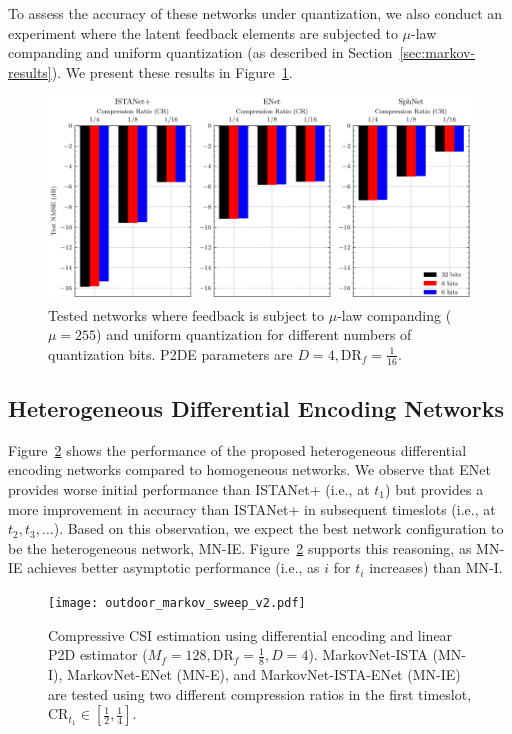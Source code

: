 To assess the accuracy of these networks under quantization, we also conduct an experiment where the latent feedback elements are subjected to $\mu$-law companding and uniform quantization (as described in Section~\ref{sec:markov-results}). We present these results in Figure~\ref{fig:net_quant}.

\begin{figure}[!hbtp]
    \centering
    \includegraphics[width=\linewidth]{./images/outdoor_net_quant.pdf}
    \caption{Tested networks where feedback is subject to $\mu$-law companding ($\mu=255$) and uniform quantization for different numbers of quantization bits. P2DE parameters are $D=4, \text{DR}_f=\frac{1}{16}$.}
    \label{fig:net_quant}
\end{figure}

\subsection{Heterogeneous Differential Encoding Networks}

Figure~\ref{fig:markov-p2d-results} shows the performance of the proposed heterogeneous differential encoding networks compared to homogeneous networks. We observe that ENet provides worse initial performance than ISTANet+ (i.e., at $t_1$) but provides a more improvement in accuracy than ISTANet+ in subsequent timeslots (i.e., at $t_2, t_3, \dots$). Based on this observation, we expect the best network configuration to be the heterogeneous network, MN-IE. Figure~\ref{fig:markov-p2d-results} supports this reasoning, as MN-IE achieves better asymptotic performance (i.e., as $i$ for $t_i$ increases) than MN-I.

\begin{figure}[!hbtp]
    \centering
    \texttt{[image: outdoor\_markov\_sweep\_v2.pdf]}
    \caption{Compressive CSI estimation using differential encoding and  linear P2D estimator ($M_f=128, \text{DR}_f=\frac{1}{8}, D=4$). MarkovNet-ISTA (MN-I), MarkovNet-ENet (MN-E), and MarkovNet-ISTA-ENet (MN-IE) are tested using two different compression ratios in the first timeslot, $\text{CR}_{t_1}\in\left[\frac{1}{2},\frac{1}{4}\right]$.}
    \label{fig:markov-p2d-results}
\end{figure}

